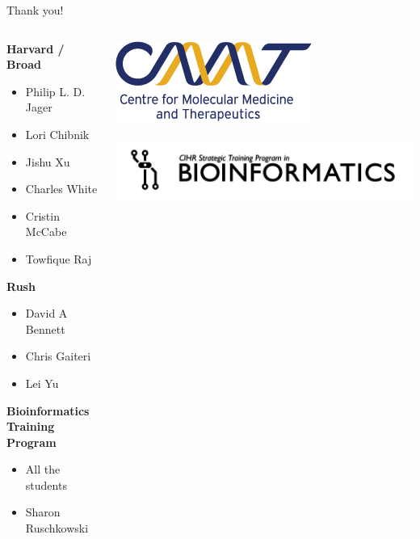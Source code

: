\documentclass{beamer}
\begin{document}
\begin{frame}{Thank you!}
    \begin{columns}
        \begin{column}{0.5\textwidth}
            \small
            \textbf{Harvard / Broad}
            \begin{itemize}
                \setlength\itemsep{-2pt}
                \item Philip L. D. Jager
                \item Lori Chibnik
                \item Jishu Xu
                \item Charles White
                \item Cristin McCabe
                \item Towfique Raj
            \end{itemize}
            \textbf{Rush}
            \begin{itemize}
                \setlength\itemsep{-2pt}
                \item David A Bennett
                \item Chris Gaiteri
                \item Lei Yu
            \end{itemize}
            \textbf{Bioinformatics Training Program}
            \begin{itemize}
                \setlength\itemsep{-2pt}
                \item All the students
                \item Sharon Ruschkowski
            \end{itemize}
        \end{column}
        \normalsize
        \begin{column}{0.5\textwidth}
            \begin{center}
                \includegraphics[scale=0.3]{logos/cmmt} \\
                \hfill\\
                \includegraphics[scale=0.2]{logos/bioinfo} \\

\end{center}
\end{column}
\end{columns}
\end{frame}
\end{document}
